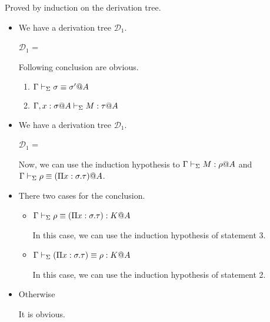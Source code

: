 Proved by induction on the derivation tree.

\begin{itemize}
	\item \TAbs
	      	      
	      We have a derivation tree $\mathcal{D}_1$.
	      	      
	      $\mathcal{D}_1$ = 
	      { \andalso {}}
	      	      
	      Following conclusion are obvious.
	      \begin{enumerate}
	      	\item $\Gamma \vdash_\Sigma \sigma \equiv \sigma'@A$
	      	\item $\G ,x:\sigma@A\V M:\tau@A$
	      \end{enumerate}
	      	      
	\item \TConv
	      	      
	      We have a derivation tree $\mathcal{D}_1$.
	      	      
	      $\mathcal{D}_1$ = 
	      { \andalso {}}
	      	      
	      Now, we can use the induction hypothesis to $\G \V M : \rho@A$ and $\Gamma \vdash_\Sigma \rho \equiv (\Pi x:\sigma.\tau)@A$.
	      	      
	\item \QTRefl
	      	      
	      There two cases for the conclusion.
	      \begin{itemize}
	      	\item $\Gamma \vdash_\Sigma \rho \equiv (\Pi x:\sigma.\tau) : K @A$
	      	      	      	      
	      	      In this case, we can use the induction hypothesis of statement 3.
	      	\item $\Gamma \vdash_\Sigma (\Pi x:\sigma.\tau) \equiv \rho : K @A$
	      	      	      	      
	      	      In this case, we can use the induction hypothesis of statement 2.
	      \end{itemize}
	      	      
	\item Otherwise
	      	      
	      It is obvious.
	      	      
\end{itemize}

